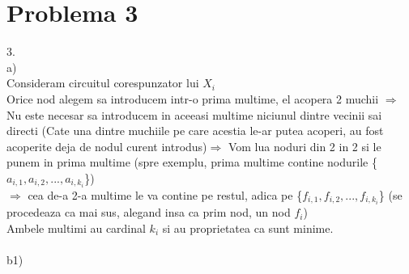 \documentclass{article}
\begin{document}
\section*{Problema 3}
\Large
3.\\
a) \\
Consideram circuitul corespunzator lui $X_{i}$\\
Orice nod alegem sa introducem intr-o prima multime, el acopera 2 muchii $\Rightarrow$\\
Nu este necesar sa introducem in aceeasi multime niciunul dintre vecinii sai directi (Cate una dintre muchiile pe care acestia le-ar putea acoperi, au fost acoperite deja de nodul curent introdus)$\Rightarrow$ Vom lua noduri din 2 in 2 si le punem in prima multime (spre exemplu, prima multime contine nodurile \{$a_{i,1}, a_{i,2}, ..., a_{i,k_i}$\})\\
$\Rightarrow$ cea de-a 2-a multime le va contine pe restul, adica pe \{$f_{i,1}, f_{i,2}, ..., f_{i,k_i}$\} (se procedeaza ca mai sus, alegand insa ca prim nod, un nod $f_i$)\\
Ambele multimi au cardinal $k_i$ si au proprietatea ca sunt minime.\\
\bigskip\\
b1)\\
\end{document}
